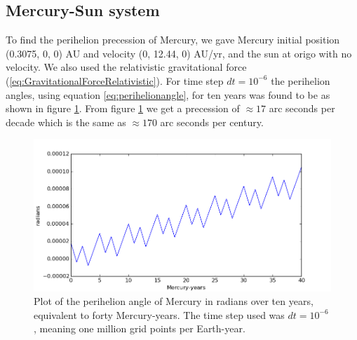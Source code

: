 \documentclass[norsk,a4paper,12pt]{article}
\begin{document}
{\subsection{Mercury-Sun system}
To find the perihelion precession of Mercury, we gave Mercury initial position (0.3075, 0, 0) AU and velocity (0, 12.44, 0) AU/yr, and the sun at origo with no velocity. We also used the relativistic gravitational force (\ref{eq:GravitationalForceRelativistic}). For time step $dt=10^{-6}$ the perihelion angles, using equation \ref{eq:perihelionangle}, for ten years was found to be as shown in figure \ref{fig:precesion}. From figure \ref{fig:precesion} we get a precession of $\approx 17$ arc seconds per decade which is the same as $\approx 170$ arc seconds per century.
\begin{figure}
\centering
\includegraphics[scale=0.7]{precesion.png}
\caption{Plot of the perihelion angle of Mercury in radians over ten years, equivalent to forty Mercury-years. The time step used was $dt=10^{-6}$, meaning one million grid points per Earth-year.}
\label{fig:precesion}
\end{figure}

}
\end{document}
